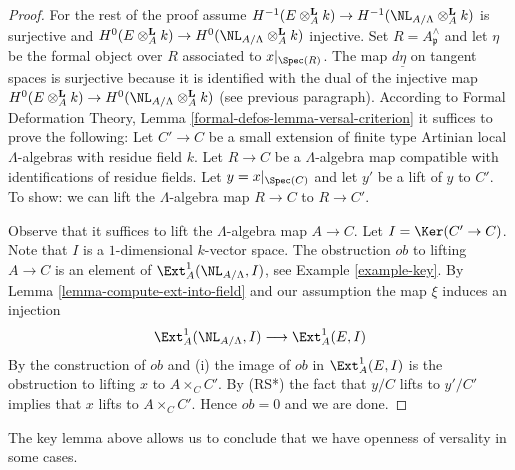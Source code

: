 \begin{proof}
\medskip\noindent
For the rest of the proof assume $H^{-1}(E \otimes_A^\mathbf{L} k) \to
H^{-1}(\NL_{A/\Lambda} \otimes_A^\mathbf{L} k)$
is surjective and
$H^0(E \otimes_A^\mathbf{L} k) \to
H^0(\NL_{A/\Lambda} \otimes_A^\mathbf{L} k)$
injective. Set $R = A_\mathfrak p^\wedge$ and let $\eta$ be the
formal object over $R$ associated to $x|_{\Spec(R)}$.
The map $d\underline{\eta}$ on tangent spaces is surjective
because it is identified with the dual of the injective map
$H^0(E \otimes_A^{\mathbf{L}} k) \to
H^0(\NL_{A/\Lambda} \otimes_A^{\mathbf{L}} k)$
(see previous paragraph). According to
Formal Deformation Theory, Lemma \ref{formal-defos-lemma-versal-criterion}
it suffices to prove the following:
Let $C' \to C$ be a small extension of finite type Artinian local
$\Lambda$-algebras with residue field $k$. Let $R \to C$ be a
$\Lambda$-algebra map compatible with identifications of residue fields.
Let $y = x|_{\Spec(C)}$ and let $y'$ be a lift of $y$ to $C'$.
To show: we can lift the $\Lambda$-algebra map $R \to C$ to $R \to C'$.

\medskip\noindent
Observe that it suffices to lift the $\Lambda$-algebra map $A \to C$.
Let $I = \Ker(C' \to C)$. Note that $I$ is a $1$-dimensional $k$-vector
space. The obstruction $ob$ to lifting $A \to C$ is an element of
$\Ext^1_A(\NL_{A/\Lambda}, I)$, see Example \ref{example-key}.
By Lemma \ref{lemma-compute-ext-into-field} and our assumption the map
$\xi$ induces an injection
$$
\Ext^1_A(\NL_{A/\Lambda}, I)
\longrightarrow
\Ext^1_A(E, I)
$$
By the construction of $ob$ and (i) the image of $ob$ in $\Ext^1_A(E, I)$
is the obstruction to lifting $x$ to $A \times_C C'$. By (RS*) the fact that
$y/C$ lifts to $y'/C'$ implies that $x$ lifts to $A \times_C C'$. Hence
$ob = 0$ and we are done.
\end{proof}

\noindent
The key lemma above allows us to conclude that we have openness of
versality in some cases.

